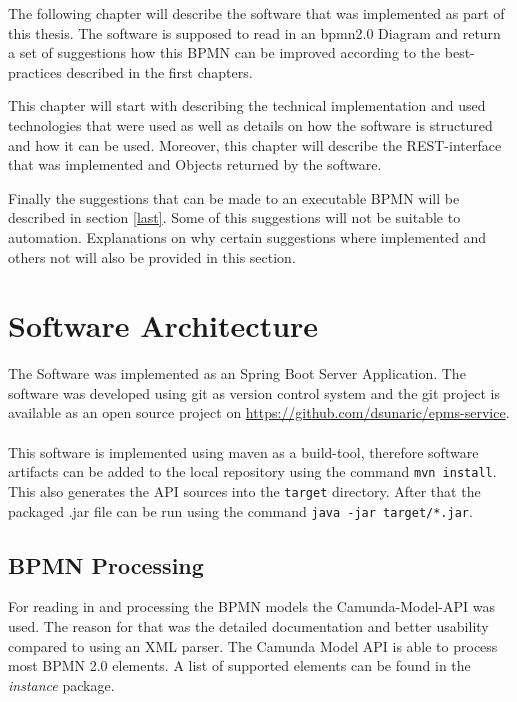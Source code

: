The following chapter will describe the software that was implemented as part of this thesis. The software is supposed to read in an \gls{bpmn}2.0 Diagram and return a set of suggestions how this BPMN can be improved according to the best-practices described in the first chapters.

This chapter will start with describing the technical implementation and used technologies that were used as well as details on how the software is structured and how it can be used. 
Moreover, this chapter will describe the REST-interface that was implemented and Objects returned by the software. 

Finally the suggestions that can be made to an executable BPMN will be described in section \ref{last}. Some of this suggestions will not be suitable to automation. Explanations on why certain suggestions where implemented and others not will also be provided in this section.
\section{Software Architecture}
The Software was implemented as an Spring Boot Server\cite{spring-boot} Application. The software was developed using git\cite{git} as version control system and the git project is available as an open source project on \url{https://github.com/dsunaric/epms-service}.\\~\\

This software is implemented using maven\cite{maven} as a build-tool, therefore software artifacts can be added to the local repository using the command \verb|mvn install|. This also generates the API sources into the \verb|target| directory. After that the packaged .jar file can be run using the command \verb|java -jar target/*.jar|. 


\subsection{BPMN Processing}
For reading in and processing the BPMN models the Camunda-Model-API\cite{camunda-model-api} was used. The reason for that was the detailed documentation and better usability compared to using an XML parser. The Camunda Model API is able to process most BPMN 2.0 elements. A list of supported elements can be found in the \textit{instance} package\cite{camunda-model-api-spoorted-elements}.
